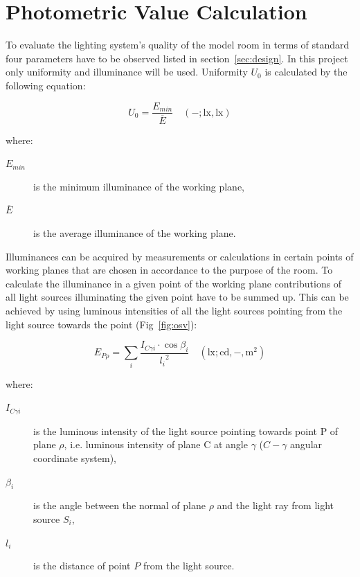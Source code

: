 \section{Photometric Value Calculation}
To evaluate the lighting system's quality of the model room in terms of standard \cite{12464} four parameters have to be observed listed in section~\ref{sec:design}. In this project only uniformity and illuminance will be used. Uniformity $U_{0}$ is calculated by the following equation:

\begin{equation}
U_{0}=\frac{E_{min}}{\overline{E}} \quad \mathrm{(-;lx,lx)}
\end{equation}

where:
\begin{description}
	\item[$E_{min}$] is the minimum illuminance of the working plane,
	\item[$\overline{E}$] is the average illuminance of the working plane.
\end{description}

Illuminances can be acquired by measurements or calculations in certain points of working planes that are chosen in accordance to the purpose of the room. To calculate the illuminance in a given point of the working plane contributions of all light sources illuminating the given point have to be summed up. This can be achieved by using luminous intensities of all the light sources pointing from the light source towards the point (Fig~\ref{fig:osv}):

\begin{equation}
E_{P\rho}=\sum_{i} \frac{I_{C \gamma i} \cdot \cos{\beta_{i}}}{{l_{i}}^{2}} \quad \mathrm{(lx;cd,-,m^{2})}
\label{eq:illSum}
\end{equation}

where:
\begin{description}
	\item[$I_{C \gamma i}$] is the luminous intensity of the light source pointing towards point P of plane $\rho$, i.e. luminous intensity of plane C at angle $\gamma$ ($C-\gamma$ angular coordinate system),
	\item[$\beta_{i}$] is the angle between the normal of plane $\rho$ and the light ray from light source $S_{i}$,
	\item[$l_{i}$] is the distance of point $P$ from the light source.
\end{description}


